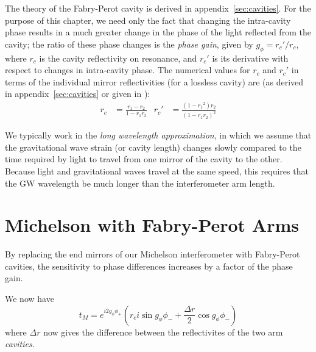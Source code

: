 The theory of the Fabry-Perot cavity is derived in 
appendix~\ref{sec:cavities}.  For the purpose of this chapter, we
need only the fact that changing the intra-cavity phase results in a
much greater change in the phase of the light reflected from the
cavity; the ratio of these phase changes is the \emph{phase gain},
given by $g_\phi = r_c'/r_c$, where $r_c$ is the cavity reflectivity on
resonance, and $r_c'$ is its derivative with respect to changes in
intra-cavity phase.  The numerical values for $r_c$ and $r_c'$ in terms of the individual mirror reflectivities (for a lossless cavity) are (as derived in appendix~\ref{sec:cavities} or given in \cite{LigoFreqResponse97}):
%
\begin{align}
r_c & = \frac{r_1 - r_2}{1 - r_1 r_2} &
r_c'& = \frac{\left(1 - {r_1}^2\right)r_2}{\left(1 - r_1 r_2\right)^2}
\end{align}



\label{sec:long-wavelength}We typically work in the \emph{long wavelength approximation}, in
which we assume that the gravitational wave strain (or cavity length)
changes slowly compared to the time required by light to travel from
one mirror of the cavity to the other.  Because light and
gravitational waves travel at the same speed, this requires that the
GW wavelength be much longer than the interferometer arm length.  

\section{Michelson with Fabry-Perot Arms}

By replacing the end mirrors of our Michelson interferometer with
Fabry-Perot cavities, the sensitivity to phase differences increases
by a factor of the phase gain.  

We now have
\begin{equation}
t_M  = e^{i 2 g_\phi \phi_+} 
\left( r_c i \sin g_\phi \phi_- + 
        \frac{\Delta r}{2} \cos g_\phi \phi_- \right)
\end{equation}
where $\Delta r$ now gives the difference between the reflectivites of the
two arm \emph{cavities}.

